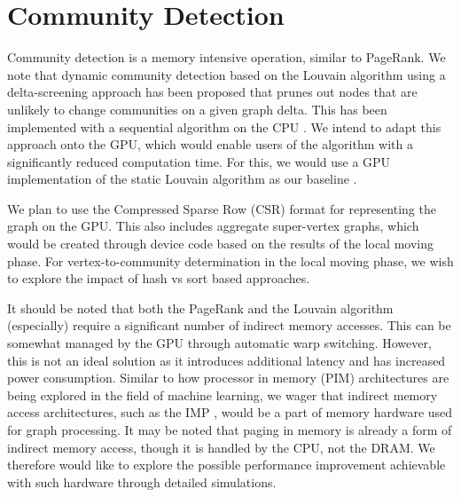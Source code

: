 \section{Community Detection}

Community detection is a memory intensive operation, similar to PageRank. We note that dynamic community detection based on the Louvain algorithm using a delta-screening approach has been proposed that prunes out nodes that are unlikely to change communities on a given graph delta. This has been implemented with a sequential algorithm on the CPU \cite{com-zarayeneh21}. We intend to adapt this approach onto the GPU, which would enable users of the algorithm with a significantly reduced computation time. For this, we would use a GPU implementation of the static Louvain algorithm as our baseline \cite{com-naim17}.

We plan to use the Compressed Sparse Row (CSR) format for representing the graph on the GPU. This also includes aggregate super-vertex graphs, which would be created through device code based on the results of the local moving phase. For vertex-to-community determination in the local moving phase, we wish to explore the impact of hash vs sort based approaches.

It should be noted that both the PageRank and the Louvain algorithm (especially) require a significant number of indirect memory accesses. This can be somewhat managed by the GPU through automatic warp switching. However, this is not an ideal solution as it introduces additional latency and has increased power consumption. Similar to how processor in memory (PIM) architectures are being explored in the field of machine learning, we wager that indirect memory access architectures, such as the IMP \cite{memory-yu15}, would be a part of memory hardware used for graph processing. It may be noted that paging in memory is already a form of indirect memory access, though it is handled by the CPU, not the DRAM. We therefore would like to explore the possible performance improvement achievable with such hardware through detailed simulations.
